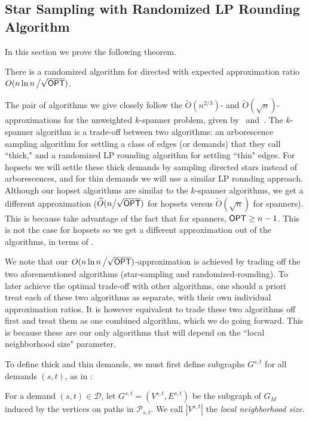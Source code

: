
\subsection{Star Sampling with Randomized LP Rounding Algorithm} \label{sec:star_sampling_rounding}


In this section we prove the following theorem.

\begin{theorem} \label{thm:bbmry_alg}
    There is a randomized algorithm for directed {\hopset} with expected approximation ratio $O( n \ln{n} \, \big/ \sqrt{{\sf OPT}})$.
\end{theorem}

The pair of algorithms we give closely follow the $\widetilde{O}(n^{2/3})$- and $\widetilde{O}(\sqrt{n})$-approximations for the unweighted $k$-spanner problem, given by~\cite{DK11} and~\cite{BBMRY11}. The $k$-spanner algorithm is a trade-off between two algorithms: an arborescence sampling algorithm for settling a class of edges (or demands) that they call ``thick," and a randomized LP rounding algorithm for settling ``thin" edges. For hopsets we will settle these thick demands by sampling directed stars instead of arborescences, and for thin demands we will use a similar LP rounding approach. Although our hopset algorithms are similar to the $k$-spanner algorithms, we get a different approximation ($\widetilde{O}( n \big/ \sqrt{{\sf OPT}})$ for hopsets versus $\widetilde{O}(\sqrt{n})$ for spanners). This is because \cite{DK11, BBMRY11} take advantage of the fact that for spanners, ${{\sf OPT}} \geq n-1$. This is not the case for hopsets so we get a different approximation out of the algorithms, in terms of {\opt}. 

We note that our $O( n \ln{n} \, \big/ \sqrt{{\sf OPT}})$-approximation is achieved by trading off the two aforementioned algorithms (star-sampling and randomized-rounding). To later achieve the optimal trade-off with other algorithms, one should a priori treat each of these two algorithms as separate, with their own individual approximation ratios. It is however equivalent to trade these two algorithms off first and treat them as one combined algorithm, which we do going forward. This is because these are our only algorithms that will depend on the ``local neighborhood size" parameter.

To define thick and thin demands, we must first define subgraphs $G^{s,t}$ for all demands $(s,t)$, as in \cite{DK11, BBMRY11}:

\begin{definition}
    For a demand $(s,t) \in \mathcal{D}$, let $G^{s,t} = (V^{s,t}, E^{s,t})$ be the subgraph of $G_M$ induced by the vertices on paths in $\mathcal{P}_{s,t}$. We call $|V^{s,t}|$ the \textit{local neighborhood size}.
\end{definition}

